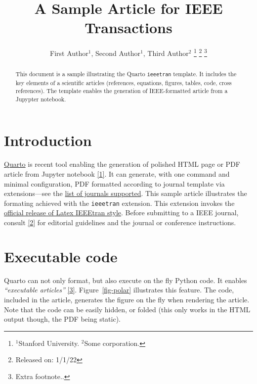 \documentclass[letterpaper, 10 pt, journal, twoside]{IEEEtran}
\newcommand\muted[1]{%
\bgroup
\hskip0pt\color{black!40!}%
#1%
\egroup
}
\begin{document}
\author{
        First Author\(^1\),     Second
Author\(^1\),     Third Author\(^2\)
    \thanks{\(^1\)Stanford University. \(^2\)Some corporation.}
    \thanks{Released on: 1/1/22}
    \thanks{Extra footnote..}
}


\title{A Sample Article for IEEE Transactions}
\maketitle

\begin{abstract}
    This document is a sample illustrating the Quarto \texttt{ieeetran}
    template. It includes the key elements of a scientific articles
    (references, equations, figures, tables, code, cross references).
    The template enables the generation of IEEE-formatted article from a
    Jupypter notebook.
\end{abstract}

\hypertarget{sec-intro}{%
\section{Introduction}\label{sec-intro}}

\href{https://quarto.org/}{Quarto} is recent tool enabling the
generation of polished HTML page or PDF article from Jupyter notebook
\protect\hyperlink{ref-Close2022-dt}{{[}1{]}}. It can generate, with one
command and minimal configuration, PDF formatted according to journal
template via extensions---see the
\href{https://github.com/quarto-journals/}{list of journals supported}.
This sample article illustrates the formating achieved with the
\texttt{ieeetran} extension. This extension invokes the
\href{https://www.ctan.org/tex-archive/macros/latex/contrib/IEEEtran/}{official
release of Latex IEEEtran style}. Before submitting to a IEEE journal,
consult \protect\hyperlink{ref-Ieee2020-zv}{{[}2{]}} for editorial
guidelines and the journal or conference instructions.

\muted{\lipsum[1-2]}

\hypertarget{executable-code}{%
\section{Executable code}\label{executable-code}}

Quarto can not only format, but also execute on the fly Python code. It
enables \emph{``executable articles''}
\protect\hyperlink{ref-Lasser2020-wo}{{[}3{]}}. Figure~\ref{fig-polar}
illustrates this feature. The code, included in the article, generates
the figure on the fly when rendering the article. Note that the code can
be easily hidden, or folded (this only works in the HTML output though,
the PDF being static).
\end{document}
